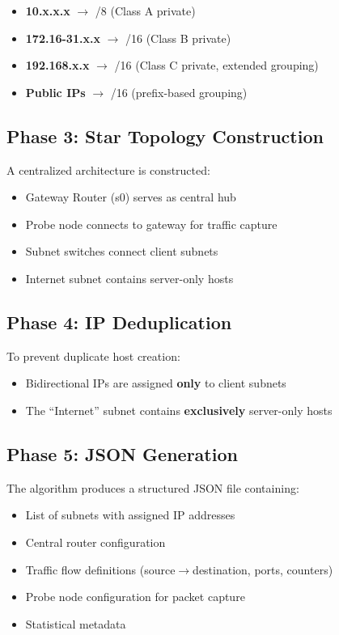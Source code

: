 \documentclass[11pt,a4paper]{article}
\begin{document}
\begin{itemize}
    \item \textbf{10.x.x.x} $\rightarrow$ /8 (Class A private)
    \item \textbf{172.16-31.x.x} $\rightarrow$ /16 (Class B private)
    \item \textbf{192.168.x.x} $\rightarrow$ /16 (Class C private, extended grouping)
    \item \textbf{Public IPs} $\rightarrow$ /16 (prefix-based grouping)
\end{itemize}

\subsection{Phase 3: Star Topology Construction}

A centralized architecture is constructed:
\begin{itemize}
    \item Gateway Router (s0) serves as central hub
    \item Probe node connects to gateway for traffic capture
    \item Subnet switches connect client subnets
    \item Internet subnet contains server-only hosts
\end{itemize}

\subsection{Phase 4: IP Deduplication}

To prevent duplicate host creation:
\begin{itemize}
    \item Bidirectional IPs are assigned \textbf{only} to client subnets
    \item The ``Internet'' subnet contains \textbf{exclusively} server-only hosts
\end{itemize}

\subsection{Phase 5: JSON Generation}

The algorithm produces a structured JSON file containing:
\begin{itemize}
    \item List of subnets with assigned IP addresses
    \item Central router configuration
    \item Traffic flow definitions (source$\rightarrow$destination, ports, counters)
    \item Probe node configuration for packet capture
    \item Statistical metadata
\end{itemize}
\end{document}
